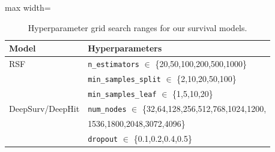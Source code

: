 \begin{table}[htbp]
\caption{Hyperparameter grid search ranges for our survival models.}
\ChSevenTableBodyStart
\begin{ChSevenFloatBody}

\centering
\begin{adjustbox}{max width=\columnwidth}
\begin{tabular}{ll}
\toprule
\textbf{Model} & \textbf{Hyperparameters} \\
\midrule
RSF & \texttt{n\_estimators} $\in$ \{20,50,100,200,500,1000\} \\
    & \texttt{min\_samples\_split} $\in$ \{2,10,20,50,100\} \\
    & \texttt{min\_samples\_leaf} $\in$ \{1,5,10,20\} \\
DeepSurv/DeepHit & \texttt{num\_nodes} $\in$ \{32,64,128,256,512,768,1024,1200,\\
& 1536,1800,2048,3072,4096\} \\
    & \texttt{dropout} $\in$ \{0.1,0.2,0.4,0.5\} \\
\bottomrule
\end{tabular}
\end{adjustbox}



\end{ChSevenFloatBody}
\end{table}